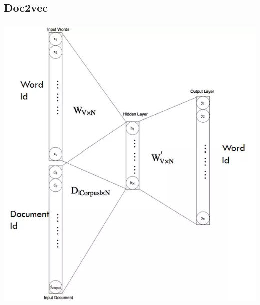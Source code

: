 \documentclass[t, 11pt]{beamer}
\begin{document}
\subsection{Doc2vec}
\begin{frame}
	\frametitle{\insertsection}
	\frametitle{\insertsubsection}  
	\includegraphics[width=0.6\linewidth]{doc2vec.png} 
\end{frame}









%
%  

%	
%	
%	
%	
%	
%	
%	



%	
%	
\end{document}
